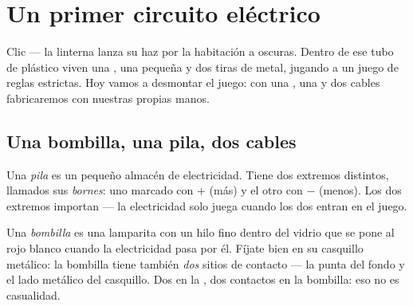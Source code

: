 \chapter{Un primer circuito eléctrico}\label{ch:g3:first-electric-circuit}

Clic --- la linterna lanza su haz por la habitación a oscuras. Dentro
de ese tubo de plástico viven una , una  pequeña y dos
tiras de metal, jugando a un juego de reglas estrictas. Hoy vamos a
desmontar el juego: con una , una  y dos cables
fabricaremos  con nuestras propias manos.

\section{Una bombilla, una pila, dos cables}

\begin{definition}[La pila]\label{def:g3:first-electric-circuit:battery}
Una \emph{pila} es un pequeño almacén de electricidad.
Tiene dos extremos distintos, llamados sus
\emph{bornes}: uno marcado con $+$ (más) y el otro con
$-$ (menos). Los dos extremos importan --- la electricidad solo juega
cuando los dos entran en el juego.
\end{definition}

\begin{definition}[La bombilla]\label{def:g3:first-electric-circuit:bulb}
Una \emph{bombilla} es una lamparita con un hilo fino
dentro del vidrio que se pone al rojo blanco cuando la electricidad
pasa por él. Fíjate bien en su casquillo metálico: la bombilla tiene también
\emph{dos} sitios de contacto --- la punta del fondo y el lado
metálico del casquillo. Dos  en la , dos contactos en la
bombilla: eso no es casualidad.
\end{definition}

